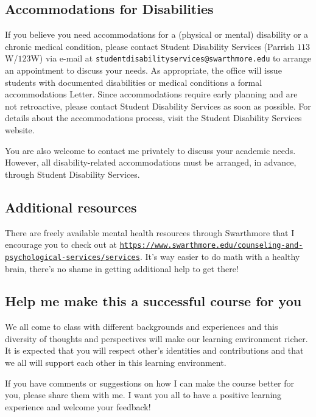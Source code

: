 \documentclass[11pt]{article}
\begin{document}
	\subsection*{Accommodations for Disabilities}
 If you believe you need accommodations for a (physical or mental) disability or a chronic medical condition, please contact Student Disability Services (Parrish $113$W/$123$W) via e-mail at
 \texttt{studentdisabilityservices@swarthmore.edu} to arrange an appointment to discuss your needs. As appropriate, the office will issue students with documented disabilities or medical conditions a formal accommodations Letter. Since accommodations require early planning and are not retroactive, please contact Student Disability Services as soon as possible. For details about the accommodations process, visit the Student Disability Services website. 
 
 You are also welcome to contact me privately to discuss your academic needs. However, all disability-related accommodations must be arranged, in advance, through Student Disability Services.

	\subsection*{Additional resources}
	There are freely available mental health resources through Swarthmore that I encourage you to check out at \href{https://www.swarthmore.edu/counseling-and-psychological-services/services}{\tt https://www.swarthmore.edu/counseling-and-psychological-services/services}.
	It's way easier to do math with a healthy brain, there's no shame in getting additional help to get there! 
 
 
 	\subsection*{Help me make this a successful course for you}
 	We all come to class with different backgrounds and experiences and this diversity of thoughts and perspectives will make our learning environment richer. It is expected that you will respect other's identities and contributions and that we all will support each other in this learning environment.
 	
 	
 	 If you have comments or suggestions on how I can make the course better for you, please share them with me. I want you all to have a positive learning experience and welcome your feedback! 
 
\end{document}
